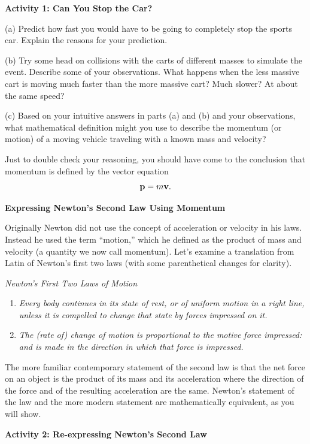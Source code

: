 \textbf{Activity 1: Can You Stop the Car?} 

(a) Predict how fast you would have to be going to completely stop the sports
car. Explain the reasons for your prediction.
\vspace{20mm}

(b) Try some head on collisions with the carts of different masses to simulate
the event. Describe some of your observations. What happens when the less massive
cart is moving much faster than the more massive cart? Much slower? At about
the same speed?
\vspace{20mm}

(c) Based on your intuitive answers in parts (a) and (b) and your observations,
what mathematical definition might you use to describe the momentum (or motion)
of a moving vehicle traveling with a known mass and velocity?
\vspace{20mm}

Just to double check your reasoning, you should have come to the conclusion
that momentum is defined by the vector equation
\[
{\bf p}=m{\bf v}.\]


\textbf{Expressing Newton's Second Law Using Momentum }

Originally Newton did not use the concept of acceleration or velocity in his
laws. Instead he used the term ``motion,'' which he defined
as the product of mass and velocity (a quantity we now call momentum). Let's
examine a translation from Latin of Newton's first two laws (with some parenthetical
changes for clarity).

\textit{Newton's First Two Laws of Motion}

\begin{enumerate}
\item \textit{Every body continues in its state of rest, or of uniform motion in a
right line, unless it is compelled to change that state by forces impressed
on it. }
\item \textit{The (rate of) change of motion is proportional to the motive force impressed:
and is made in the direction in which that force is impressed.}
\end{enumerate}
The more familiar contemporary statement of the second law is that the net force
on an object is the product of its mass and its acceleration where the direction
of the force and of the resulting acceleration are the same. Newton's statement
of the law and the more modern statement are mathematically equivalent, as you
will show.

\textbf{Activity 2: Re-expressing Newton's Second Law} 

